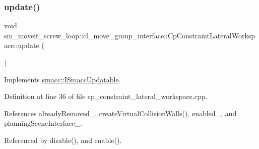 \subsubsection{\texorpdfstring{update()}{update()}}
{\footnotesize\ttfamily void sm\+\_\+moveit\+\_\+screw\+\_\+loop\+::cl\+\_\+move\+\_\+group\+\_\+interface\+::\+Cp\+Constraint\+Lateral\+Workspace\+::update (\begin{DoxyParamCaption}{ }\end{DoxyParamCaption})\hspace{0.3cm}{\ttfamily [virtual]}}



Implements \hyperlink{classsmacc_1_1ISmaccUpdatable_a84ee0520cbefdb1d412bed54650b028e}{smacc\+::\+I\+Smacc\+Updatable}.



Definition at line 36 of file cp\+\_\+constraint\+\_\+lateral\+\_\+workspace.\+cpp.



References already\+Removed\+\_\+, create\+Virtual\+Collision\+Walls(), enabled\+\_\+, and planning\+Scene\+Interface\+\_\+.



Referenced by disable(), and enable().


